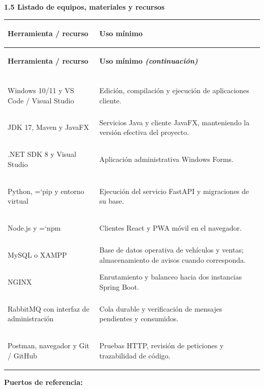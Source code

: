 \documentclass[11pt,a4paper]{article}
\renewcommand{\_}{\oldunderscore\allowbreak}
\DeclareRobustCommand{\texttt}[1]{%
  {\upshape\ttfamily\fontsize{9}{10.8}\selectfont\hyphenchar\font=`\-\relax #1}%
}
\begin{document}
\vspace{0.3cm}

\noindent\textbf{1.5 Listado de equipos, materiales y recursos}

\vspace{0.1cm}

{\renewcommand{\arraystretch}{1.15}
\begin{xltabular}{\textwidth}{|>{\bfseries\raggedright\arraybackslash\hspace{0pt}}p{5.4cm}|X|}
\hline
\textbf{Herramienta / recurso} & \textbf{Uso mínimo} \\
\hline
\endfirsthead
\hline
\textbf{Herramienta / recurso} & \textbf{Uso mínimo \textit{(continuación)}} \\
\hline
\endhead
\hline
{} \\
\hline
\endfoot
\hline
\endlastfoot
Windows 10/11 y VS Code / Visual Studio & Edición, compilación y ejecución de aplicaciones cliente. \\
\hline
JDK 17, Maven y JavaFX & Servicios Java y cliente JavaFX, manteniendo la versión efectiva del proyecto. \\
\hline
.NET SDK 8 y Visual Studio & Aplicación administrativa Windows Forms. \\
\hline
Python, \texttt{pip} y entorno virtual & Ejecución del servicio FastAPI y migraciones de su base. \\
\hline
Node.js y \texttt{npm} & Clientes React y PWA móvil en el navegador. \\
\hline
MySQL o XAMPP & Base de datos operativa de vehículos y ventas; almacenamiento de avisos cuando corresponda. \\
\hline
NGINX & Enrutamiento y balanceo hacia dos instancias Spring Boot. \\
\hline
RabbitMQ con interfaz de administración & Cola durable y verificación de mensajes pendientes y consumidos. \\
\hline
Postman, navegador y Git / GitHub & Pruebas HTTP, revisión de peticiones y trazabilidad de código. \\
\end{xltabular}
\addtocounter{table}{-1}}

\vspace{0.3cm}

\noindent\textbf{Puertos de referencia:}

\vspace{0.1cm}
\end{document}
